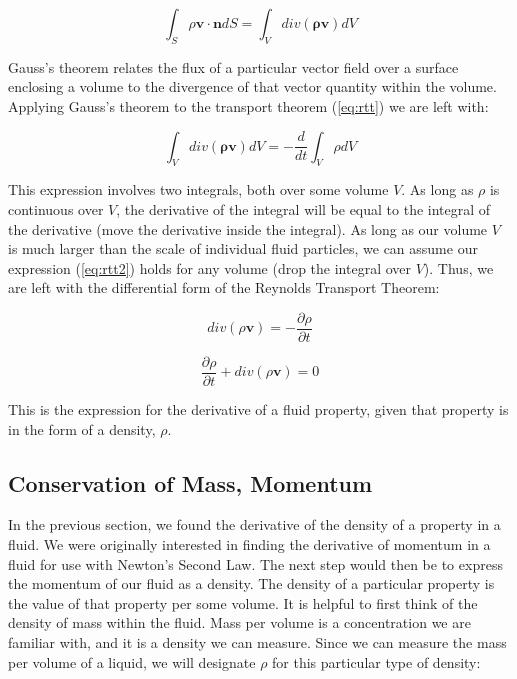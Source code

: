 \documentclass[twocolumn,12pth]{article}
\begin{document}
\begin{equation}
\int_S \rho \mathbf{v} \cdot \mathbf{n} dS = \int_V div(\mathbf{\rho{v}}) dV
\end{equation}

Gauss's theorem relates the flux of a particular vector field over a surface enclosing a volume to the divergence of that vector quantity within the volume.
Applying Gauss's theorem to the transport theorem (\ref{eq:rtt}) we are left with:

\begin{equation}
\int_V div(\mathbf{\rho{v}}) dV = - \frac{d}{dt} \int_{V} \rho dV
\label{eq:rtt2}
\end{equation}

This expression involves two integrals, both over some volume $V$.
As long as $\rho$ is continuous over $V$, the derivative of the integral will be equal to the integral of the derivative (move the derivative inside the integral).
As long as our volume $V$ is much larger than the scale of individual fluid particles, we can assume our expression (\ref{eq:rtt2}) holds for any volume (drop the integral over $V$).
Thus, we are left with the differential form of the Reynolds Transport Theorem:

\begin{equation*}
div(\rho \mathbf{v}) = -\frac{\partial{\rho}}{\partial{t}}
\end{equation*}

\begin{equation}
\frac{\partial{\rho}}{\partial{t}} + div(\rho \mathbf{v}) = 0
\label{eq:der}
\end{equation}

This is the expression for the derivative of a fluid property, given that property is in the form of a density, $\rho$.


\subsection{Conservation of Mass, Momentum}

In the previous section, we found the derivative of the density of a property in a fluid.
We were originally interested in finding the derivative of momentum in a fluid for use with Newton's Second Law.
The next step would then be to express the momentum of our fluid as a density.
The density of a particular property is the value of that property per some volume.
It is helpful to first think of the density of mass within the fluid.
Mass per volume is a concentration we are familiar with, and it is a density we can measure.
Since we can measure the mass per volume of a liquid, we will designate $\rho$ for this particular type of density:
\end{document}
